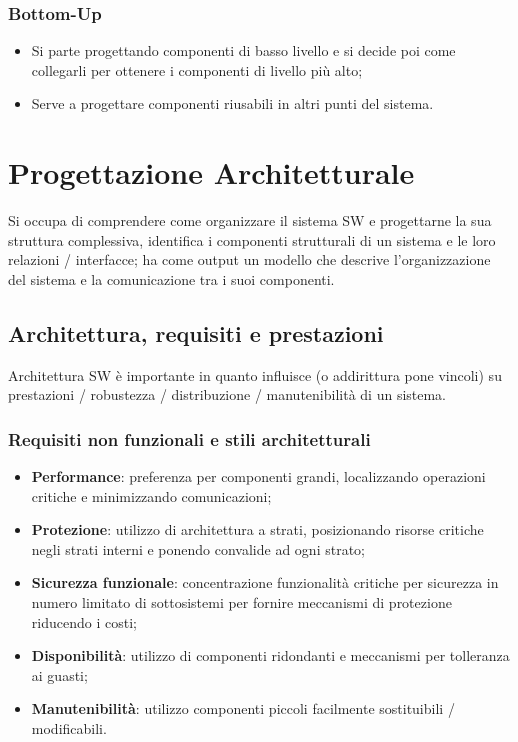 \documentclass{article}
\begin{document}
      \subsubsection{Bottom-Up}
        \begin{itemize}
          \item Si parte progettando componenti di basso livello e si decide poi come collegarli per ottenere i componenti di livello più alto; 
          \item Serve a progettare componenti riusabili in altri punti del sistema.
        \end{itemize}
  \section{Progettazione Architetturale}
    Si occupa di comprendere come organizzare il sistema SW e progettarne la sua struttura complessiva, identifica i componenti strutturali di un sistema e le loro relazioni / interfacce; ha come output un modello che descrive l'organizzazione del sistema e la comunicazione tra i suoi componenti.
    \subsection{Architettura, requisiti e prestazioni}
      Architettura SW è importante in quanto influisce (o addirittura pone vincoli) su prestazioni / robustezza / distribuzione / manutenibilità di un sistema. \\ 
      \subsubsection{Requisiti non funzionali e stili architetturali}
        \begin{itemize}
            \item \textbf{Performance}: preferenza per componenti grandi, localizzando operazioni critiche e minimizzando comunicazioni; 
            \item \textbf{Protezione}: utilizzo di architettura a strati, posizionando risorse critiche negli strati interni e ponendo convalide ad ogni strato;
            \item \textbf{Sicurezza funzionale}: concentrazione funzionalità critiche per sicurezza in numero limitato di sottosistemi per fornire meccanismi di protezione riducendo i costi;
            \item \textbf{Disponibilità}: utilizzo di componenti ridondanti e meccanismi per tolleranza ai guasti;
            \item \textbf{Manutenibilità}: utilizzo componenti piccoli facilmente sostituibili / modificabili.
        \end{itemize}
\end{document}
